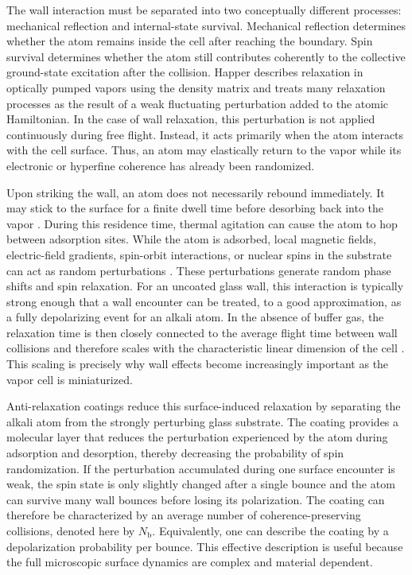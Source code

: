 The wall interaction must be separated into two conceptually different processes: mechanical reflection and internal-state survival. Mechanical reflection determines whether the atom remains inside the cell after reaching the boundary. Spin survival determines whether the atom still contributes coherently to the collective ground-state excitation after the collision. Happer describes relaxation in optically pumped vapors using the density matrix and treats many relaxation processes as the result of a weak fluctuating perturbation added to the atomic Hamiltonian. In the case of wall relaxation, this perturbation is not applied continuously during free flight. Instead, it acts primarily when the atom interacts with the cell surface. Thus, an atom may elastically return to the vapor while its electronic or hyperfine coherence has already been randomized.

Upon striking the wall, an atom does not necessarily rebound immediately. It may stick to the surface for a finite dwell time before desorbing back into the vapor \cite{OP_Happer_1972,Aiacoavc_ChiEtAl_2020}. During this residence time, thermal agitation can cause the atom to hop between adsorption sites. While the atom is adsorbed, local magnetic fields, electric-field gradients, spin-orbit interactions, or nuclear spins in the substrate can act as random perturbations \cite{OP_Happer_1972}. These perturbations generate random phase shifts and spin relaxation. For an uncoated glass wall, this interaction is typically strong enough that a wall encounter can be treated, to a good approximation, as a fully depolarizing event for an alkali atom. In the absence of buffer gas, the relaxation time is then closely connected to the average flight time between wall collisions and therefore scales with the characteristic linear dimension of the cell \cite{OP_Happer_1972}. This scaling is precisely why wall effects become increasingly important as the vapor cell is miniaturized.

Anti-relaxation coatings reduce this surface-induced relaxation by separating the alkali atom from the strongly perturbing glass substrate. The coating provides a molecular layer that reduces the perturbation experienced by the atom during adsorption and desorption, thereby decreasing the probability of spin randomization. If the perturbation accumulated during one surface encounter is weak, the spin state is only slightly changed after a single bounce and the atom can survive many wall bounces before losing its polarization. The coating can therefore be characterized by an average number of coherence-preserving collisions, denoted here by \(N_{\text{b}}\). Equivalently, one can describe the coating by a depolarization probability per bounce. This effective description is useful because the full microscopic surface dynamics are complex and material dependent.


